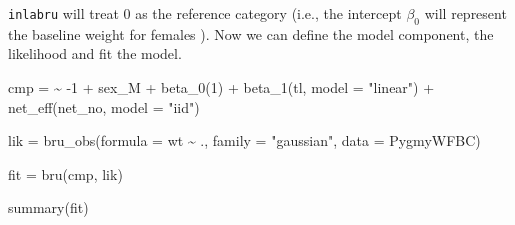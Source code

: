 \documentclass[
  letterpaper,
  DIV=11,
  numbers=noendperiod]{scrartcl}
\newenvironment{Shaded}{\begin{snugshade}}{\end{snugshade}}
\newcommand{\AttributeTok}[1]{\textcolor[rgb]{0.40,0.45,0.13}{#1}}
\newcommand{\DecValTok}[1]{\textcolor[rgb]{0.68,0.00,0.00}{#1}}
\newcommand{\ErrorTok}[1]{\textcolor[rgb]{0.68,0.00,0.00}{#1}}
\newcommand{\FunctionTok}[1]{\textcolor[rgb]{0.28,0.35,0.67}{#1}}
\newcommand{\NormalTok}[1]{\textcolor[rgb]{0.00,0.23,0.31}{#1}}
\newcommand{\OtherTok}[1]{\textcolor[rgb]{0.00,0.23,0.31}{#1}}
\newcommand{\SpecialCharTok}[1]{\textcolor[rgb]{0.37,0.37,0.37}{#1}}
\newcommand{\StringTok}[1]{\textcolor[rgb]{0.13,0.47,0.30}{#1}}
\begin{document}
\texttt{inlabru} will treat 0 as the reference category (i.e., the
intercept \(\beta_0\) will represent the baseline weight for females ).
Now we can define the model component, the likelihood and fit the model.

\begin{Shaded}
\begin{Highlighting}[]
\NormalTok{cmp }\OtherTok{=}  \ErrorTok{\textasciitilde{}} \SpecialCharTok{{-}}\DecValTok{1} \SpecialCharTok{+}\NormalTok{ sex\_M }\SpecialCharTok{+}  \FunctionTok{beta\_0}\NormalTok{(}\DecValTok{1}\NormalTok{)  }\SpecialCharTok{+} \FunctionTok{beta\_1}\NormalTok{(tl, }\AttributeTok{model =} \StringTok{"linear"}\NormalTok{) }\SpecialCharTok{+}   \FunctionTok{net\_eff}\NormalTok{(net\_no, }\AttributeTok{model =} \StringTok{"iid"}\NormalTok{)}

\NormalTok{lik }\OtherTok{=}  \FunctionTok{bru\_obs}\NormalTok{(}\AttributeTok{formula =}\NormalTok{ wt }\SpecialCharTok{\textasciitilde{}}\NormalTok{ .,}
            \AttributeTok{family =} \StringTok{"gaussian"}\NormalTok{,}
            \AttributeTok{data =}\NormalTok{ PygmyWFBC)}

\NormalTok{fit }\OtherTok{=} \FunctionTok{bru}\NormalTok{(cmp, lik)}

\FunctionTok{summary}\NormalTok{(fit)}
\end{Highlighting}
\end{Shaded}
\end{document}
